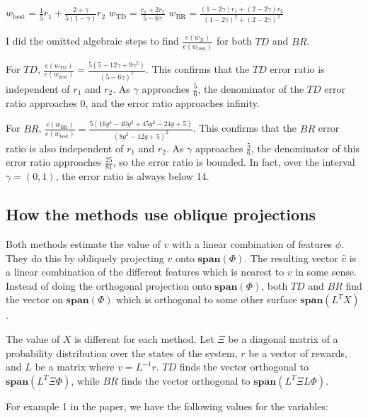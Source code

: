 \documentclass{article}
\newcommand\mspan[1]{\textbf{span}(#1)}
\begin{document}
$w_{\text{best}} = \frac{1}{5}r_1 + \frac{2+\gamma}{5(1-\gamma)}r_2$
$w_{\text{TD}} = \frac{r_1+2r_2}{5-6\gamma}$
$w_{\text{BR}} = \frac{(1-2\gamma)r_1+(2-2\gamma)r_2}{(1-2\gamma)^2+(2-2\gamma)^2}$

I did the omitted algebraic steps to find $\frac{e(w_X)}{e(w_{\text{best}})}$ for both $TD$ and $BR$.

For $TD$, $\frac{e(w_{\text{TD}})}{e(w_{\text{best}})} = \frac{5(5-12\gamma + 9\gamma^2)}{(5 - 6 \gamma)^2}$. This confirms that the $TD$ error ratio is independent of $r_1$ and $r_2$. As $\gamma$ approaches $\frac{5}{6}$, the denominator of the $TD$ error ratio approaches 0, and the error ratio approaches infinity.

For $BR$, $\frac{e(w_{\text{BR}})}{e(w_{\text{best}})} = \frac{5 \left(16 g^4-40 g^3+45 g^2-24 g+5\right)}{\left(8 g^2-12 g+5\right)^2}$. This confirms that the $BR$ error ratio is also independent of $r_1$ and $r_2$. As $\gamma$ approaches $\frac{5}{6}$, the denominator of this error ratio approaches $\frac{25}{81}$, so the error ratio is bounded. In fact, over the interval $\gamma = (0,1)$, the error ratio is always below 14.

\subsection{How the methods use oblique projections}

Both methods estimate the value of $v$ with a linear combination of features $\phi$. They do this by obliquely projecting $v$ onto $\mspan{\Phi}$. The resulting vector $\hat{v}$ is a linear combination of the different features which is nearest to $v$ in some sense. Instead of doing the orthogonal projection onto $\mspan{\Phi}$, both $TD$ and $BR$ find the vector on $\mspan{\Phi}$ which is orthogonal to some other surface $\mspan{L^TX}$.

The value of $X$ is different for each method. Let $\Xi$ be a diagonal matrix of a probability distribution over the states of the system, $r$ be a vector of rewards, and $L$ be a matrix where $v = L^{-1}r$. $TD$ finds the vector orthogonal to $\mspan{L^T\Xi\Phi}$, while $BR$ finds the vector orthogonal to $\mspan{L^T\Xi L \Phi}$.

For example 1 in the paper, we have the following values for the variables:
\end{document}
